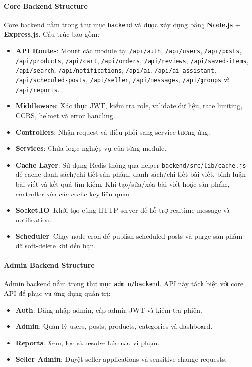 \paragraph{Core Backend Structure} Core backend nằm trong thư mục \texttt{backend} và được xây dựng bằng \textbf{Node.js} + \textbf{Express.js}. Cấu trúc bao gồm:

\begin{itemize}
    \item \textbf{API Routes}: Mount các module tại \texttt{/api/auth}, \texttt{/api/users}, \texttt{/api/posts}, \texttt{/api/products}, \texttt{/api/cart}, \texttt{/api/orders}, \texttt{/api/reviews}, \texttt{/api/saved-items}, \texttt{/api/search}, \texttt{/api/notifications}, \texttt{/api/ai}, \texttt{/api/ai-assistant}, \texttt{/api/scheduled-posts}, \texttt{/api/seller}, \texttt{/api/messages}, \texttt{/api/groups} và \texttt{/api/reports}.
    \item \textbf{Middleware}: Xác thực JWT, kiểm tra role, validate dữ liệu, rate limiting, CORS, helmet và error handling.
    \item \textbf{Controllers}: Nhận request và điều phối sang service tương ứng.
    \item \textbf{Services}: Chứa logic nghiệp vụ của từng module.
    \item \textbf{Cache Layer}: Sử dụng Redis thông qua helper \texttt{backend/src/lib/cache.js} để cache danh sách/chi tiết sản phẩm, danh sách/chi tiết bài viết, bình luận bài viết và kết quả tìm kiếm. Khi tạo/sửa/xóa bài viết hoặc sản phẩm, controller xóa các cache key liên quan.
    \item \textbf{Socket.IO}: Khởi tạo cùng HTTP server để hỗ trợ realtime message và notification.
    \item \textbf{Scheduler}: Chạy node-cron để publish scheduled posts và purge sản phẩm đã soft-delete khi đến hạn.
\end{itemize}

\paragraph{Admin Backend Structure} Admin backend nằm trong thư mục \texttt{admin/backend}. API này tách biệt với core API để phục vụ ứng dụng quản trị:

\begin{itemize}
    \item \textbf{Auth}: Đăng nhập admin, cấp admin JWT và kiểm tra phiên.
    \item \textbf{Admin}: Quản lý users, posts, products, categories và dashboard.
    \item \textbf{Reports}: Xem, lọc và resolve báo cáo vi phạm.
    \item \textbf{Seller Admin}: Duyệt seller applications và sensitive change requests.
\end{itemize}

